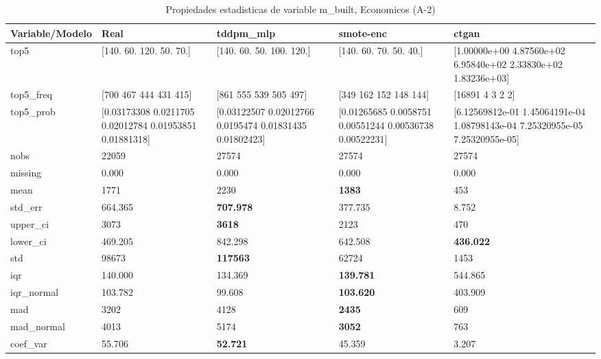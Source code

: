 \begin{table}[H]
\centering
\fontsize{8}{14}\selectfont
\caption{Propiedades  estadisticas de variable m\_built, Economicos (A-2)}
\label{table-stats-economicos-a-2-m_built}
\begin{tabular}{|l|m{10em}|m{10em}|m{10em}|m{10em}|}
\hline
 \rowcolor[gray]{0.8}
Variable/Modelo & Real & tddpm\_mlp & smote-enc & ctgan \\
\hline top5 & [140.  60. 120.  50.  70.] & [140.  60.  50. 100. 120.] & [140.  60.  70.  50.  40.] & [1.00000e+00 4.87560e+02 6.95840e+02 2.33830e+02 1.83236e+03] \\
\hline top5\_freq & [700 467 444 431 415] & [861 555 539 505 497] & [349 162 152 148 144] & [16891     4     3     2     2] \\
\hline top5\_prob & [0.03173308 0.0211705  0.02012784 0.01953851 0.01881318] & [0.03122507 0.02012766 0.0195474  0.01831435 0.01802423] & [0.01265685 0.0058751  0.00551244 0.00536738 0.00522231] & [6.12569812e-01 1.45064191e-04 1.08798143e-04 7.25320955e-05
 7.25320955e-05] \\
\hline nobs & 22059 & 27574 & 27574 & 27574 \\
\hline missing & 0.000 & 0.000 & 0.000 & 0.000 \\
\hline mean & 1771 & 2230 & \bfseries 1383 & \cellcolor[rgb]{0.9, 0.54, 0.52} 453 \\
\hline std\_err & 664.365 & \bfseries 707.978 & 377.735 & \cellcolor[rgb]{0.9, 0.54, 0.52} 8.752 \\
\hline upper\_ci & 3073 & \bfseries 3618 & 2123 & \cellcolor[rgb]{0.9, 0.54, 0.52} 470 \\
\hline lower\_ci & 469.205 & \cellcolor[rgb]{0.9, 0.54, 0.52} 842.298 & 642.508 & \bfseries 436.022 \\
\hline std & 98673 & \bfseries 117563 & 62724 & \cellcolor[rgb]{0.9, 0.54, 0.52} 1453 \\
\hline iqr & 140.000 & 134.369 & \bfseries 139.781 & \cellcolor[rgb]{0.9, 0.54, 0.52} 544.865 \\
\hline iqr\_normal & 103.782 & 99.608 & \bfseries 103.620 & \cellcolor[rgb]{0.9, 0.54, 0.52} 403.909 \\
\hline mad & 3202 & 4128 & \bfseries 2435 & \cellcolor[rgb]{0.9, 0.54, 0.52} 609 \\
\hline mad\_normal & 4013 & 5174 & \bfseries 3052 & \cellcolor[rgb]{0.9, 0.54, 0.52} 763 \\
\hline coef\_var & 55.706 & \bfseries 52.721 & 45.359 & \cellcolor[rgb]{0.9, 0.54, 0.52} 3.207 \\

\end{tabular}
\end{table}
